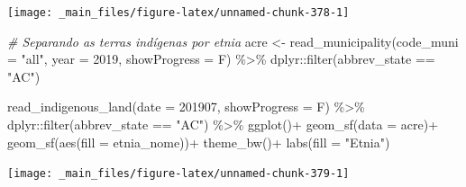 \documentclass[
  brazilian,
]{book}
\newenvironment{Shaded}{\begin{snugshade}}{\end{snugshade}}
\newcommand{\AttributeTok}[1]{\textcolor[rgb]{0.77,0.63,0.00}{#1}}
\newcommand{\CommentTok}[1]{\textcolor[rgb]{0.56,0.35,0.01}{\textit{#1}}}
\newcommand{\DecValTok}[1]{\textcolor[rgb]{0.00,0.00,0.81}{#1}}
\newcommand{\FunctionTok}[1]{\textcolor[rgb]{0.00,0.00,0.00}{#1}}
\newcommand{\NormalTok}[1]{#1}
\newcommand{\OtherTok}[1]{\textcolor[rgb]{0.56,0.35,0.01}{#1}}
\newcommand{\SpecialCharTok}[1]{\textcolor[rgb]{0.00,0.00,0.00}{#1}}
\newcommand{\StringTok}[1]{\textcolor[rgb]{0.31,0.60,0.02}{#1}}
\begin{document}
\begin{center}\texttt{[image: \_main\_files/figure-latex/unnamed-chunk-378-1]} \end{center}

\begin{Shaded}
\begin{Highlighting}[]
\CommentTok{\# Separando as terras indígenas por etnia}
\NormalTok{acre }\OtherTok{\textless{}{-}} \FunctionTok{read\_municipality}\NormalTok{(}\AttributeTok{code\_muni =} \StringTok{"all"}\NormalTok{,}
                          \AttributeTok{year =} \DecValTok{2019}\NormalTok{,}
                          \AttributeTok{showProgress =}\NormalTok{ F) }\SpecialCharTok{\%\textgreater{}\%} 
\NormalTok{  dplyr}\SpecialCharTok{::}\FunctionTok{filter}\NormalTok{(abbrev\_state }\SpecialCharTok{==} \StringTok{"AC"}\NormalTok{)}

\FunctionTok{read\_indigenous\_land}\NormalTok{(}\AttributeTok{date =} \DecValTok{201907}\NormalTok{,}
                     \AttributeTok{showProgress =}\NormalTok{ F) }\SpecialCharTok{\%\textgreater{}\%} 
\NormalTok{  dplyr}\SpecialCharTok{::}\FunctionTok{filter}\NormalTok{(abbrev\_state }\SpecialCharTok{==} \StringTok{"AC"}\NormalTok{) }\SpecialCharTok{\%\textgreater{}\%} 
  \FunctionTok{ggplot}\NormalTok{()}\SpecialCharTok{+}
  \FunctionTok{geom\_sf}\NormalTok{(}\AttributeTok{data =}\NormalTok{ acre)}\SpecialCharTok{+}
  \FunctionTok{geom\_sf}\NormalTok{(}\FunctionTok{aes}\NormalTok{(}\AttributeTok{fill =}\NormalTok{ etnia\_nome))}\SpecialCharTok{+}
  \FunctionTok{theme\_bw}\NormalTok{()}\SpecialCharTok{+}
  \FunctionTok{labs}\NormalTok{(}\AttributeTok{fill =} \StringTok{"Etnia"}\NormalTok{)}
\end{Highlighting}
\end{Shaded}

\begin{center}\texttt{[image: \_main\_files/figure-latex/unnamed-chunk-379-1]} \end{center}
\end{document}
